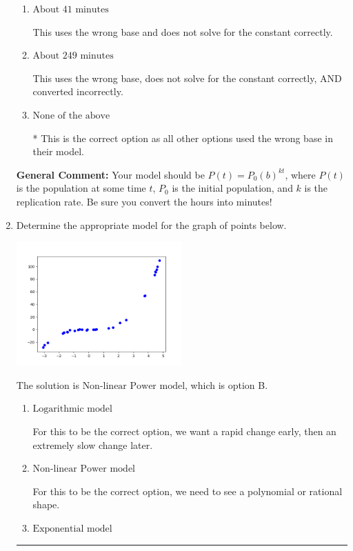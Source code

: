 \documentclass{extbook}[14pt]
\newcommand{\litem}[1]{\item #1

\rule{\textwidth}{0.4pt}}
\begin{document}
\begin{enumerate}
{\begin{enumerate}[label=\Alph*.]
This uses the wrong base and solves for the constant correctly but converted incorrectly.
\item \( \text{About } 41 \text{ minutes} \)

This uses the wrong base and does not solve for the constant correctly.
\item \( \text{About } 249 \text{ minutes} \)

This uses the wrong base, does not solve for the constant correctly, AND converted incorrectly.
\item \( \text{None of the above} \)

* This is the correct option as all other options used the wrong base in their model.
\end{enumerate}

\textbf{General Comment:} Your model should be $P(t) = P_0(b)^{kt}$, where $P(t)$ is the population at some time $t$, $P_0$ is the initial population, and $k$ is the replication rate. Be sure you convert the hours into minutes!
}
\litem{
Determine the appropriate model for the graph of points below.

\begin{center}
    \includegraphics[width=0.5\textwidth]{../Figures/identifyModelGraph11A.png}
\end{center}




The solution is \( \text{Non-linear Power model} \), which is option B.\begin{enumerate}[label=\Alph*.]
\item \( \text{Logarithmic model} \)

For this to be the correct option, we want a rapid change early, then an extremely slow change later.
\item \( \text{Non-linear Power model} \)

For this to be the correct option, we need to see a polynomial or rational shape.
\item \( \text{Exponential model} \)


\end{enumerate}}
\end{enumerate}
\end{document}
